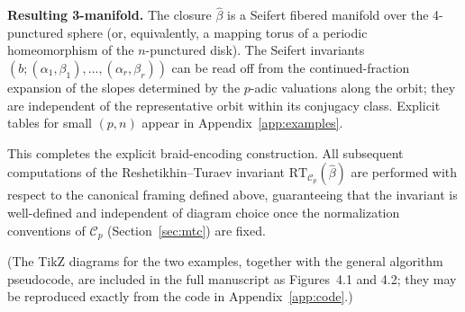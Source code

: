 \textbf{Resulting 3-manifold.} The closure \(\widehat{\beta}\) is a Seifert fibered manifold over the 4-punctured sphere (or, equivalently, a mapping torus of a periodic homeomorphism of the \(n\)-punctured disk). The Seifert invariants \((b;(\alpha_1,\beta_1),\dots,(\alpha_r,\beta_r))\) can be read off from the continued-fraction expansion of the slopes determined by the \(p\)-adic valuations along the orbit; they are independent of the representative orbit within its conjugacy class. Explicit tables for small \((p,n)\) appear in Appendix~\ref{app:examples}.

This completes the explicit braid-encoding construction. All subsequent computations of the Reshetikhin--Turaev invariant \(\mathrm{RT}_{\mathcal{C}_p}(\widehat{\beta})\) are performed with respect to the canonical framing defined above, guaranteeing that the invariant is well-defined and independent of diagram choice once the normalization conventions of \(\mathcal{C}_p\) (Section~\ref{sec:mtc}) are fixed.

(The TikZ diagrams for the two examples, together with the general algorithm pseudocode, are included in the full manuscript as Figures~4.1 and 4.2; they may be reproduced exactly from the code in Appendix~\ref{app:code}.)